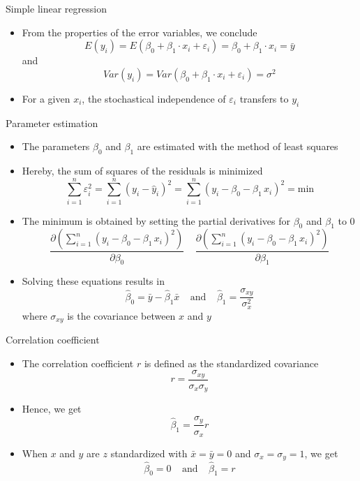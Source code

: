 \documentclass[aspectratio=169]{beamer}
\begin{document}
\begin{frame}{Simple linear regression}
  \begin{itemize}
    \item From the properties of the error variables, we conclude
\[
  E(y_i) = E(\beta_0 + \beta_1 \cdot x_i + \varepsilon_i) =
  \beta_0 + \beta_1 \cdot x_i = \bar{y}
\]
and
\[
  Var(y_i) = Var(\beta_0 + \beta_1 \cdot x_i + \varepsilon_i) = \sigma^2
\]
\item For a given $x_i$, the stochastical independence of $\varepsilon_i$
  transfers to $y_i$\\[2ex]
  \end{itemize}
\end{frame}

\begin{frame}{Parameter estimation}
  \begin{itemize}
    \item The parameters $\beta_0$ and $\beta_1$ are estimated with the method
      of least squares
    \item Hereby, the sum of squares of the residuals is minimized
      \[
        \sum_{i=1}^n \varepsilon_i^2
        = \sum_{i=1}^n (y_i - \hat{y}_i)^2
        = \sum_{i=1}^n (y_i - \beta_0 - \beta_1 \, x_i)^2
        = \text{min}
      \]
    \item The minimum is obtained by setting the partial derivatives for
      $\beta_0$ and $\beta_1$ to 0
      \[
        \frac{\partial \left( \sum_{i=1}^n (y_i - \beta_0 - \beta_1 \, x_i)^2\right)}
        {\partial \beta_0}  ~~~~~
        \frac{\partial \left( \sum_{i=1}^n (y_i - \beta_0 - \beta_1 \, x_i)^2\right)}
        {\partial \beta_1} 
      \]
    \item Solving these equations results in
      \[
        \hat\beta_0 = \bar y - \hat\beta_1 \bar x ~~~~~ \text{and} ~~~~~
        \hat\beta_1 = \frac{\sigma_{xy}}{\sigma^2_{x}}
      \]
      where $\sigma_{xy}$ is the covariance between $x$ and $y$
  \end{itemize}
\end{frame}

\begin{frame}{Correlation coefficient}
  \begin{itemize}
    \item The correlation coefficient $r$ is defined as the standardized
      covariance
      \[
        r = \frac{\sigma_{xy}}{\sigma_x \sigma_y}
      \]
    \item Hence, we get
      \[
        \hat\beta_1 = \frac{\sigma_{y}}{\sigma_x} r
      \]
    \item When $x$ and $y$ are $z$ standardized with $\bar x = \bar y = 0$ and
      $\sigma_x = \sigma_y = 1$, we get
      \[
        \hat\beta_0 = 0 ~~~~~ \text{and} ~~~~~ \hat\beta_1 = r
      \]
  \end{itemize}
\end{frame}
\end{document}
